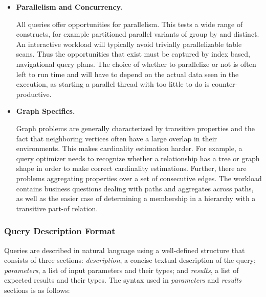 \begin{itemize}
    \item \textbf{Parallelism and Concurrency.}

        All queries offer opportunities for parallelism.  This tests a wide
        range of constructs, for example partitioned parallel variants of
        group by and distinct.  An interactive workload will typically avoid
        trivially parallelizable table scans.  Thus the opportunities that
        exist must be captured by index based, navigational query plans.  The
        choice of whether to parallelize or not is often left to run time and
        will have to depend on the actual data seen in the execution, as
        starting a parallel thread with too little to do is
        counter-productive.


    \item \textbf{Graph Specifics.}

        Graph problems are generally characterized by transitive properties
        and the fact that neighboring vertices often have a large overlap in
        their environments.  This makes cardinality estimation harder.  For
        example, a query optimizer needs to recognize whether a relationship
        has a tree or graph shape in order to make correct cardinality
        estimations.  Further, there are problems aggregating properties over
        a set of consecutive edges.  The workload contains business questions
        dealing with paths and aggregates across paths, as well as the easier
        case of determining a membership in a hierarchy with a transitive
        part-of relation.
\end{itemize}


\subsubsection{Query Description Format}
\label{sub:queries_structure}
Queries are described in natural language using a well-defined structure that consists of three sections:
\textit{description}, a concise textual description of the query; 
\textit{parameters}, a list of input parameters and their types;
and \textit{results}, a list of expected results and their types.
The syntax used in \textit{parameters} and \textit{results} sections is as follows:


